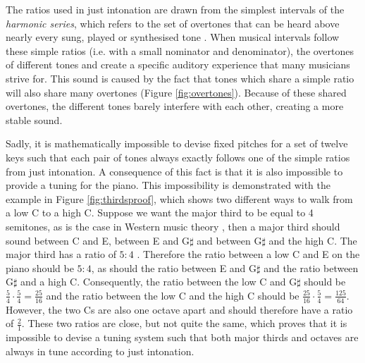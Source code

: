 \documentclass[a4paper]{article}
\begin{document}
The ratios used in just intonation are drawn from the simplest intervals of the \textit{harmonic series}, which refers to the set of overtones that can be heard above nearly every sung, played or synthesised tone \cite{jeng_relative_2011}. When musical intervals follow these simple ratios (i.e. with a small nominator and denominator), the overtones of different tones  and create a specific auditory experience that many musicians strive for. This sound is caused by the fact that tones which share a simple ratio will also share many overtones (Figure \ref{fig:overtones}). Because of these shared overtones, the different tones barely interfere with each other, creating a more stable sound.

Sadly, it is mathematically impossible to devise fixed pitches for a set of twelve keys such that each pair of tones always exactly follows one of the simple ratios from just intonation. A consequence of this fact is that it is also impossible to provide a  tuning for the piano. This impossibility is demonstrated with the example in Figure \ref{fig:thirdsproof}, which shows two different ways to walk from a low C to a high C. Suppose we want the major third to be equal to 4 semitones, as is the case in Western music theory \cite{forte_tonal_1979}, then a major third should sound between C and E, between E and G$\sharp$ and between G$\sharp$ and the high C. The major third has a ratio of $5:4$ \cite{van_de_craats_fis_1989}. Therefore the ratio between a low C and E on the piano should be $5:4$, as should the ratio between E and G$\sharp$ and the ratio between G$\sharp$ and a high C. Consequently, the ratio between the low C and G$\sharp$ should be $\frac54 \cdot \frac54 = \frac{25}{16}$ and the ratio between the low C and the high C should be $\frac{25}{16} \cdot \frac54 = \frac{125}{64}$. However, the two Cs are also one octave apart and should therefore have a ratio of $\frac21$. These two ratios are close, but not quite the same, which proves that it is impossible to devise a tuning system such that both major thirds and octaves are always in tune according to just intonation.
\end{document}
